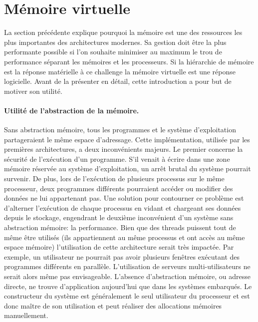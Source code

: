 \section{Mémoire virtuelle} \label{sec:memoire_virtuelle}

La section précédente explique pourquoi la mémoire est une des ressources les plus importantes des architectures modernes. Sa gestion doit être la plus performante possible  si l'on souhaite minimiser au maximum le trou de performance séparant les mémoires et les processeurs. Si la hiérarchie de mémoire est la réponse matérielle à ce challenge la mémoire virtuelle est une réponse logicielle. Avant de la présenter en détail, cette introduction a pour but de motiver son utilité.

\paragraph{Utilité de l'abstraction de la mémoire.} Sans abstraction mémoire, tous les programmes et le système d'exploitation partageraient le même espace d'adressage. Cette implémentation, utilisée par les premières architectures, a deux inconvénients majeurs. Le premier concerne la sécurité de l'exécution d'un programme. S'il venait à écrire dans une zone mémoire réservée au système d'exploitation, un arrêt brutal du système pourrait survenir. De plus, lors de l'exécution de plusieurs processus sur le même processeur, deux programmes différents pourraient accéder ou modifier des données ne lui appartenant pas. Une solution pour contourner ce problème est d'alterner l'exécution de chaque processus en vidant et chargeant ses données depuis le stockage, engendrant le deuxième inconvénient d'un système sans abstraction mémoire: la performance. Bien que des threads puissent tout de même être utilisés (ils appartiennent au même processus et ont accès au même espace mémoire) l'utilisation de cette architecture serait très impactée. Par exemple, un utilisateur ne pourrait pas avoir plusieurs fenêtres exécutant des programmes différents en parallèle. L'utilisation de serveurs multi-utilisateurs ne serait alors même pas envisageable. L'absence d'abstraction mémoire, ou adresse directe, ne trouve d'application aujourd'hui que dans les systèmes embarqués. Le constructeur du système est généralement le seul utilisateur du processeur et est donc maître de son utilisation et peut réaliser des allocations mémoires manuellement.

